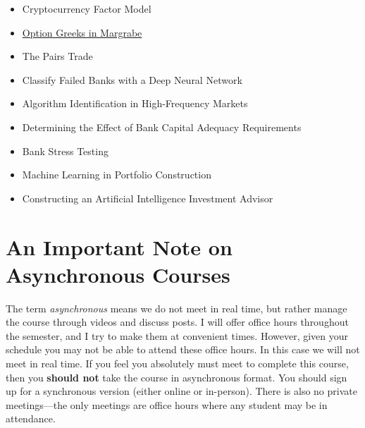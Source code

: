 \documentclass[11pt]{article}
\begin{document}
\begin{itemize}
\item Cryptocurrency Factor Model
\item \href{https://colab.research.google.com/drive/1OtpEsx3RyoishcmKX4Q0a\_DZ2XHM3rje?usp=sharing}{Option Greeks in Margrabe}
\item The Pairs Trade
\item Classify Failed Banks with a Deep Neural Network
\item Algorithm Identification in High-Frequency Markets
\item Determining the Effect of Bank Capital Adequacy Requirements
\item Bank Stress Testing
\item Machine Learning in Portfolio Construction
\item Constructing an Artificial Intelligence Investment Advisor
\end{itemize}
\section{An Important Note on Asynchronous Courses}
\label{sec:org3c8085e}

The term \emph{asynchronous} means we do not meet in real time, but rather manage the course through videos and discuss posts.  I will offer office hours throughout the semester, and I try to make them at convenient times. However, given your schedule you may not be able to attend these office hours.  In this case we will not meet in real time.  If you feel you absolutely must meet to complete this course, then you \textbf{\textbf{should not}} take the course in asynchronous format.  You should sign up for a synchronous version (either online or in-person).  There is also no private meetings---the only meetings are office hours where any student may be in attendance.
\end{document}
